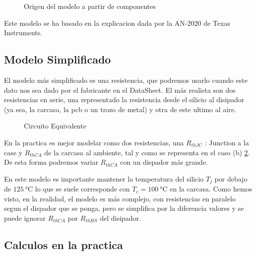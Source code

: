 \begin{figure}[H]
    \centering
    
    \caption{Origen del modelo a partir de componentes}
    \label{fig:ThermalModelOrigin}
\end{figure}

Este modelo se ha basado en la explicacion dada por la AN-2020\cite{TiAN2020} de Texas Instruments.

\subsection{Modelo Simplificado}
El modelo más simplificado es una resistencia, que podremos usarlo cuando este dato nos sea dado
por el fabricante en el DataSheet.
El más realista son dos resistencias en serie, una representado la resistencia desde el silicio al
disipador (ya sea, la carcasa, la pcb o un trozo de metal) y otra de este ultimo al aire.



\begin{figure}[H]
    \centering
    
    \caption{Circuito Equivalente}
    \label{fig:ThermalEquivalent}
\end{figure}

En la practica es mejor modelar como dos resistencias, una $R_{thJC}$ :
Junction a la case y $R_{thCA}$ de la 
carcasa al ambiente, tal y como se representa en el caso (b) \ref{fig:ThermalEquivalent}.
De esta forma podremos variar $R_{thCA}$ con un dispador más grande.

En este modelo es importante mantener la temperatura del silicio $T_j$ por debajo de
$\SI{125}{\celsius}$ lo que se suele corresponde con $T_c=\SI{100}{\celsius}$ en la carcasa.
Como hemos visto, en la realidad, el modelo es más complejo, con resistencias en paralelo segun el dispador
que se ponga, pero se simplifica por la diferencia valores y se puede ignorar $R_{thCA}$
por $R_{thHS}$ del disipador.


\subsection{Calculos en la practica} 
